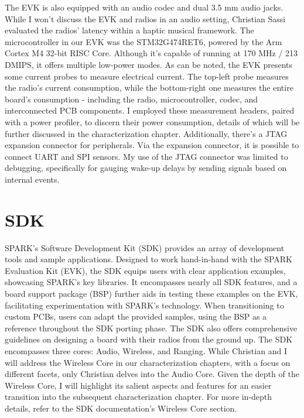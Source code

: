 The EVK is also equipped with an audio codec and dual 3.5 mm audio jacks. While I won't discuss the EVK and radios in an audio setting, Christian Sassi evaluated the radios' latency within a haptic musical framework. The microcontroller in our EVK was the STM32G474RET6, powered by the Arm Cortex M4 32-bit RISC Core. Although it's capable of running at 170 MHz / 213 DMIPS, it offers multiple low-power modes.
As can be noted, the EVK presents some current probes to measure electrical current. The top-left probe measures the radio's current consumption, while the bottom-right one measures the entire board's consumption - including the radio, microcontroller, codec, and interconnected PCB components.  I employed these measurement headers, paired with a power profiler, to discern their power consumption, details of which will be further discussed in the characterization chapter. Additionally, there's a JTAG expansion connector for peripherals. Via the expansion connector, it is possible to connect UART and SPI sensors. My use of the JTAG connector was limited to debugging, specifically for gauging wake-up delays by sending signals based on internal events.

\section{SDK}
\label{sec:spark_sdk}
SPARK's Software Development Kit (SDK) provides an array of development tools and sample applications. Designed to work hand-in-hand with the SPARK Evaluation Kit (EVK), the SDK equips users with clear application examples, showcasing SPARK's key libraries. It encompasses nearly all SDK features, and a board support package (BSP) further aids in testing these examples on the EVK, facilitating experimentation with SPARK's technology.
When transitioning to custom PCBs, users can adapt the provided samples, using the BSP as a reference throughout the SDK porting phase. The SDK also offers comprehensive guidelines on designing a board with their radios from the ground up. %
The SDK encompasses three cores: Audio, Wireless, and Ranging. While Christian and I will address the Wireless Core in our characterization chapters, with a focus on different facets, only Christian delves into the Audio Core. Given the depth of the Wireless Core, I will highlight its salient aspects and features for an easier transition into the subsequent characterization chapter. For more in-depth details, refer to the SDK documentation's Wireless Core section.

